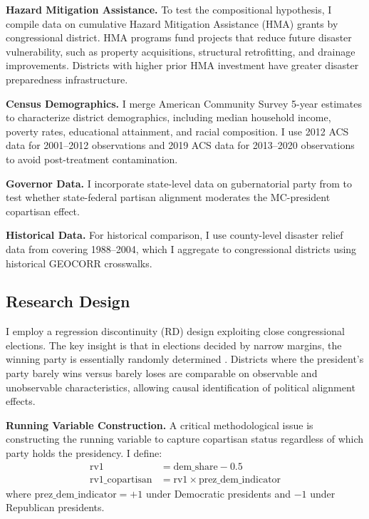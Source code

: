 \documentclass[12pt,letterpaper,oneside]{book}
\begin{document}
\textbf{Hazard Mitigation Assistance.} To test the compositional hypothesis, I compile data on cumulative Hazard Mitigation Assistance (HMA) grants by congressional district. HMA programs fund projects that reduce future disaster vulnerability, such as property acquisitions, structural retrofitting, and drainage improvements. Districts with higher prior HMA investment have greater disaster preparedness infrastructure.

\textbf{Census Demographics.} I merge American Community Survey 5-year estimates to characterize district demographics, including median household income, poverty rates, educational attainment, and racial composition. I use 2012 ACS data for 2001--2012 observations and 2019 ACS data for 2013--2020 observations to avoid post-treatment contamination.

\textbf{Governor Data.} I incorporate state-level data on gubernatorial party from \cite{klarner2013state} to test whether state-federal partisan alignment moderates the MC-president copartisan effect.

\textbf{Historical Data.} For historical comparison, I use county-level disaster relief data from \cite{healy2009myopic} covering 1988--2004, which I aggregate to congressional districts using historical GEOCORR crosswalks.

\subsection{Research Design}

I employ a regression discontinuity (RD) design exploiting close congressional elections. The key insight is that in elections decided by narrow margins, the winning party is essentially randomly determined \citep{lee2008randomized}. Districts where the president's party barely wins versus barely loses are comparable on observable and unobservable characteristics, allowing causal identification of political alignment effects.

\textbf{Running Variable Construction.} A critical methodological issue is constructing the running variable to capture copartisan status regardless of which party holds the presidency. I define:
\begin{align}
\text{rv1} &= \text{dem\_share} - 0.5 \\
\text{rv1\_copartisan} &= \text{rv1} \times \text{prez\_dem\_indicator}
\end{align}
where $\text{prez\_dem\_indicator} = +1$ under Democratic presidents and $-1$ under Republican presidents.
\end{document}
